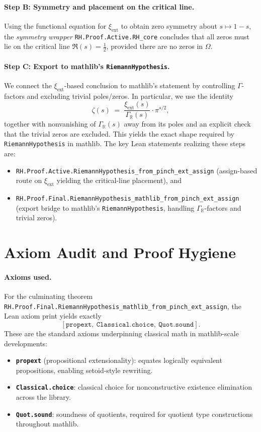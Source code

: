 \documentclass[11pt]{article}
\theoremstyle{plain}
\theoremstyle{definition}
\begin{document}
\paragraph{Step B: Symmetry and placement on the critical line.}
Using the functional equation for \(\xi_{\mathrm{ext}}\) to obtain zero symmetry about \(s\mapsto 1-s\), the \emph{symmetry wrapper}
\texttt{RH.Proof.Active.RH\_core} concludes that all zeros must lie on the critical line \(\Re(s)=\tfrac12\), provided there are no zeros in \(\Omega\).

\paragraph{Step C: Export to mathlib's \texttt{RiemannHypothesis}.}
We connect the \(\xi_{\mathrm{ext}}\)-based conclusion to mathlib's statement by controlling \(\Gamma\)-factors and excluding trivial poles/zeros. In particular, we use the identity
\[
  \zeta(s) \;=\; \frac{\xi_{\mathrm{ext}}(s)}{\Gamma_{\mathbb{R}}(s)} \cdot \pi^{s/2},
\]
together with nonvanishing of \(\Gamma_{\mathbb{R}}(s)\) away from its poles and an explicit check that the trivial zeros are excluded. This yields the exact shape required by \texttt{RiemannHypothesis} in mathlib.
The key Lean statements realizing these steps are:
\begin{itemize}
  \item \texttt{RH.Proof.Active.RiemannHypothesis\_from\_pinch\_ext\_assign} (assign-based route on \(\xi_{\mathrm{ext}}\) yielding the critical-line placement), and
  \item \texttt{RH.Proof.Final.RiemannHypothesis\_mathlib\_from\_pinch\_ext\_assign} (export bridge to mathlib's \texttt{RiemannHypothesis}, handling \(\Gamma_{\mathbb{R}}\)-factors and trivial zeros).
\end{itemize}

\section{Axiom Audit and Proof Hygiene}
\label{sec:audit}

\paragraph{Axioms used.}
For the culminating theorem \texttt{RH.Proof.Final.RiemannHypothesis\_mathlib\_from\_pinch\_ext\_assign}, the Lean axiom print yields exactly
\[
  [\texttt{propext},\ \texttt{Classical.choice},\ \texttt{Quot.sound}].
\]
These are the standard axioms underpinning classical math in mathlib-scale developments:
\begin{itemize}
  \item \textbf{\texttt{propext}} (propositional extensionality): equates logically equivalent propositions, enabling setoid-style rewriting.
  \item \textbf{\texttt{Classical.choice}}: classical choice for nonconstructive existence elimination across the library.
  \item \textbf{\texttt{Quot.sound}}: soundness of quotients, required for quotient type constructions throughout mathlib.
\end{itemize}
\end{document}
